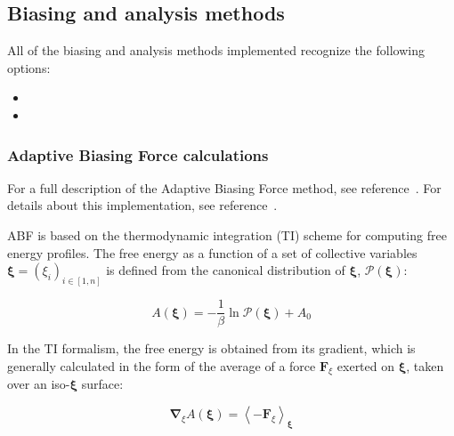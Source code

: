 \subsection{Biasing and analysis methods}
\label{sec:colvarbias}

All of the biasing and analysis methods implemented recognize the
following options:
\begin{itemize}

\item %

\item %

\end{itemize}


\subsubsection{Adaptive Biasing Force calculations}
\label{sec:colvarbias_abf}

For a full description of the Adaptive Biasing Force method, see
reference~\cite{Darve2008}. For details about this implementation,
see reference~\cite{Henin2004}.

ABF is based on the thermodynamic integration (TI) scheme for
computing free energy profiles. The free energy as a function
of a set of collective variables $\bm{\xi}=(\xi_{i})_{i\in[1,n]}$
is defined from the canonical distribution of $\bm{\xi}$, ${\mathcal P}(\bm{\xi})$:

\begin{equation}
  \label{eq:free}
  A(\bm{\xi}) = -\frac{1}{\beta} \ln {\mathcal P}(\bm{\xi}) + A_0
\end{equation}

In the TI formalism, the free energy is obtained from its gradient, 
which is generally calculated in the form of the average of a force
$\bm{F}_\xi$ exerted on $\bm{\xi}$, taken over an iso-$\bm{\xi}$ surface:

\begin{equation}
  \label{eq:gradient}
  \bm{\nabla}_\xi A(\bm{\xi}) = \left\langle -\bm{F}_\xi \right\rangle_\bm{\xi}
\end{equation}

